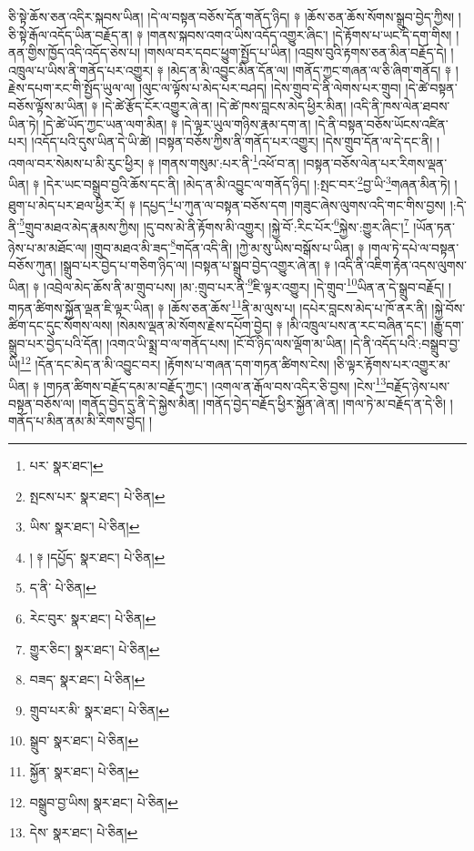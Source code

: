 ཅི་སྟེ་ཆོས་ཅན་འདིར་སྐབས་ཡིན། །དེ་ལ་བསྟན་བཅོས་དོན་གནོད་ཉིད། ༈ །ཆོས་ཅན་ཆོས་སོགས་སྒྲུབ་བྱེད་ཀྱིས། །ཅི་སྟེ་རྒོལ་འདོད་ཡིན་བརྗོད་ན། ༈ །གནས་སྐབས་འགའ་ཡིས་འདོད་འགྱུར་ཞིང་། །དེ་རྟོགས་པ་ཡང་དེ་དག་གིས། །ནན་གྱིས་ཁྱོད་འདི་འདོད་ཅེས་པ། །གསལ་བར་དབང་ཕྱུག་སྤྱོད་པ་ཡིན། །འབྲས་བུའི་རྟགས་ཅན་མིན་བརྗོད་དེ། །འཁྲུལ་པ་ཡིས་ནི་གནོད་པར་འགྱུར། ༈ །མེད་ན་མི་འབྱུང་མིན་དོན་ལ། །གནོད་ཀྱང་གཞན་ལ་ཅི་ཞིག་གནོད། ༈ །རྗེས་དཔག་རང་གི་སྤྱོད་ཡུལ་ལ། །ལུང་ལ་ལྟོས་པ་མེད་པར་བཤད། །དེས་གྲུབ་དེ་ནི་ལེགས་པར་གྲུབ། །དེ་ཚེ་བསྟན་བཅོས་ལྟོས་མ་ཡིན། ༈ །དེ་ཚེ་རྩོད་ངོར་འགྱུར་ཞེ་ན། །དེ་ཚེ་ཁས་བླངས་མེད་ཕྱིར་མིན། །འདི་ནི་ཁས་ལེན་ཐབས་ཡིན་ཏེ། །དེ་ཚེ་ཡོད་ཀྱང་ཡན་ལག་མིན། ༈ །དེ་ལྟར་ཡུལ་གཉིས་རྣམ་དག་ན། །དེ་ནི་བསྟན་བཅོས་ཡོངས་འཛིན་པར། །འདོད་པའི་དུས་ཡིན་དེ་ཡི་ཚེ། །བསྟན་བཅོས་ཀྱིས་ནི་གནོད་པར་འགྱུར། །དེས་གྲུབ་དོན་ལ་དེ་དང་ནི། །འགལ་བར་སེམས་པ་མི་རུང་ཕྱིར། ༈ །གནས་གསུམ་:པར་ནི་\footnote{པར་  སྣར་ཐང་། }འཕོ་བ་ན། །བསྟན་བཅོས་ལེན་པར་རིགས་ལྡན་ཡིན། ༈ །དེར་ཡང་བསྒྲུབ་བྱའི་ཆོས་དང་ནི། །མེད་ན་མི་འབྱུང་ལ་གནོད་ཉིད། །:སྤང་བར་\footnote{སྤངས་པར་  སྣར་ཐང་།  པེ་ཅིན། }བྱ་ཡི་\footnote{ཡིས་  སྣར་ཐང་།  པེ་ཅིན། }གཞན་མིན་ཏེ། །ཐུག་པ་མེད་པར་ཐལ་ཕྱིར་རོ། ༈ །དཔྱད་\footnote{། ༈ །དཔྱོད་  སྣར་ཐང་།  པེ་ཅིན། }པ་ཀུན་ལ་བསྟན་བཅོས་དག །གཟུང་ཞེས་ལུགས་འདི་གང་གིས་བྱས། །:དེ་ནི་\footnote{ད་ནི་  པེ་ཅིན། }གྲུབ་མཐའ་མེད་རྣམས་ཀྱིས། །དུ་བས་མེ་ནི་རྟོགས་མི་འགྱུར། །སྐྱེ་བོ་:རིང་པོར་\footnote{རེང་བུར་  སྣར་ཐང་།  པེ་ཅིན། }སྐྱེས་:གྱུར་ཞིང་།\footnote{གྱུར་ཅིང་།  སྣར་ཐང་།  པེ་ཅིན། } །ཡོན་ཏན་ཉེས་པ་མ་མཐོང་ལ། །གྲུབ་མཐའ་མི་ཟད་\footnote{བཟད་  སྣར་ཐང་།  པེ་ཅིན། }གདོན་འདི་ནི། །ཀྱེ་མ་སུ་ཡིས་བསྒོས་པ་ཡིན། ༈ །གལ་ཏེ་དཔེ་ལ་བསྟན་བཅོས་ཀུན། །སྒྲུབ་པར་བྱེད་པ་གཅིག་ཉིད་ལ། །བསྟན་པ་སྒྲུབ་བྱེད་འགྱུར་ཞེ་ན། ༈ །འདི་ནི་འཇིག་རྟེན་འདས་ལུགས་ཡིན། ༈ །འབྲེལ་མེད་ཆོས་ནི་མ་གྲུབ་པས། །མ་:གྲུབ་པར་ནི་\footnote{གྲུབ་པར་མི་  སྣར་ཐང་།  པེ་ཅིན། }ཇི་ལྟར་འགྱུར། །དེ་གྲུབ་\footnote{སྒྲུབ་  སྣར་ཐང་།  པེ་ཅིན། }ཡིན་ན་དེ་སྒྲུབ་བརྗོད། །གཏན་ཚིགས་སྐྱོན་ལྡན་ཇི་ལྟར་ཡིན། ༈ །ཆོས་ཅན་ཆོས་\footnote{སྐྱོན་  སྣར་ཐང་།  པེ་ཅིན། }ནི་མ་ལུས་པ། །དཔེར་བླངས་མེད་པ་ཁོ་ནར་ནི། །སྐྱེ་བོས་ཚིག་དང་དུང་སོགས་ལས། །སེམས་ལྡན་མེ་སོགས་རྗེས་དཔོག་བྱེད། ༈ །མི་འཁྲུལ་པས་ན་རང་བཞིན་དང་། །རྒྱུ་དག་སྒྲུབ་པར་བྱེད་པའི་དོན། །འགའ་ཡི་སྨྲ་བ་ལ་གནོད་པས། །ངོ་བོ་ཉིད་ལས་ལྡོག་མ་ཡིན། །དེ་ནི་འདོད་པའི་:བསྒྲུབ་བྱ་ཡི།\footnote{བསྒྲུབ་བྱ་ཡིས།  སྣར་ཐང་།  པེ་ཅིན། } །དོན་དང་མེད་ན་མི་འབྱུང་བར། །རྟོགས་པ་གཞན་དག་གཏན་ཚིགས་ངེས། །ཅི་ལྟར་རྟོགས་པར་འགྱུར་མ་ཡིན། ༈ །གཏན་ཚིགས་བརྗོད་དམ་མ་བརྗོད་ཀྱང་། །འགལ་ན་རྒོལ་བས་འདིར་ཅི་བྱས། །ངེས་\footnote{དེས་  སྣར་ཐང་།  པེ་ཅིན། }བརྗོད་ཉེས་པས་བསྟན་བཅོས་ལ། །གནོད་བྱེད་དུ་ནི་དེ་སྐྱེས་མིན། །གནོད་བྱེད་བརྗོད་ཕྱིར་སྐྱོན་ཞེ་ན། །གལ་ཏེ་མ་བརྗོད་ན་དེ་ཅི། །གནོད་པ་མིན་ནམ་མི་རིགས་བྱེད། །
